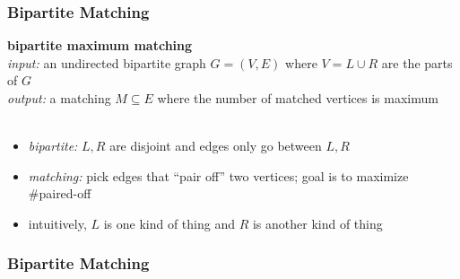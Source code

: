 \documentclass{beamer}
\newcommand{\stanza}{ \\~\ }
\begin{document}
\begin{frame} \frametitle{Bipartite Matching}
\textbf{bipartite maximum matching} \\
\emph{input:} an undirected bipartite graph $G=(V, E)$ where $V=L \cup R$
  are the parts of $G$ \\
\emph{output:} a matching $M \subseteq E$ where the number of matched vertices
  is maximum \stanza

\begin{itemize}
  \item \emph{bipartite:} $L, R$ are disjoint and edges only go between $L, R$
  \item \emph{matching:} pick edges that ``pair off'' two vertices; goal is to
    maximize \#paired-off
  \item intuitively, $L$ is one kind of thing and $R$ is another kind of thing
\end{itemize}
\end{frame}

\begin{frame} \frametitle{Bipartite Matching}
\begin{center}
\end{center}
\end{frame}
\end{document}
